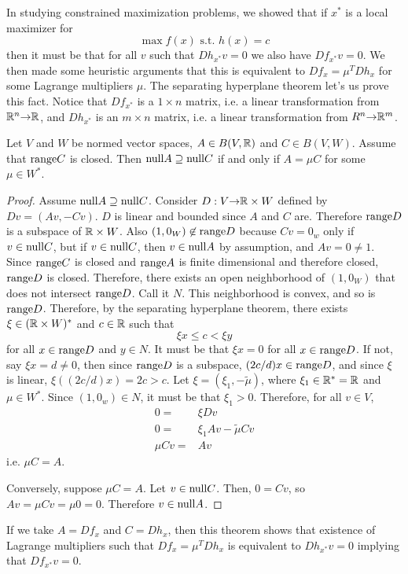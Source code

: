 In studying constrained maximization problems, we showed that if $x^*$
is a local maximizer for 
\[ \max f(x) \text{ s.t. } h(x) = c \]
then it must be that for all $v$ such that $Dh_{x^*} v = 0$ we also have
$Df_{x^*} v = 0$. We then made some heuristic arguments that this is
equivalent to $Df_x = \mu^T Dh_x$ for some Lagrange multipliers
$\mu$. The separating hyperplane theorem let's us prove this
fact. Notice that $Df_{x^*}$ is a $1 \times n$ matrix, i.e. a linear
transformation from $\mathbb{R}^n {\rightarrow} \mathbb{R}$, and $Dh_{x^*}$ is an $m \times n$
matrix, i.e. a linear transformation from $R^n {\rightarrow} \mathbb{R}^m$. 
\begin{theorem}\label{thm:multipliers}
  Let $V$ and $W$ be normed vector spaces, $A \in B(V,\mathbb{R})$ and
  $C \in B(V,W)$. Assume that $\mathrm{range} C$ is closed. Then
  $\mathrm{null} A \supseteq \mathrm{null} C$ if and only if $A = \mu C$ for some
  $\mu \in W^*$.
\end{theorem}
\begin{proof}
  Assume $\mathrm{null} A \supseteq \mathrm{null} C$. Consider $D:V {\rightarrow} \mathbb{R} \times W$
  defined by $Dv = (Av, -Cv)$. $D$ is linear and bounded since $A$ and
  $C$ are.  Therefore $\mathrm{range} D$ is a subspace of $\mathbb{R} \times W$. Also
  $(1,0_W) \not\in \mathrm{range} D$ because $Cv = 0_w$ only if
  $v \in \mathrm{null} C$, but if $v \in \mathrm{null} C$, then $v \in \mathrm{null} A$ by
  assumption, and $Av = 0 \neq 1$. Since $\mathrm{range} C$ is closed and
  $\mathrm{range} A$ is finite dimensional and therefore closed, $\mathrm{range} D$ is
  closed. Therefore, there exists an open neighborhood of $(1,0_W)$
  that does not intersect $\mathrm{range} D$. Call it $N$. This neighborhood
  is convex, and so is $\mathrm{range} D$. Therefore, by the separating
  hyperplane theorem, there exists $\xi \in (\mathbb{R} \times W)^*$ and
  $c \in \mathbb{R}$ such that
  \[ \xi x \leq c < \xi y \]
  for all $x \in \mathrm{range} D$ and $y \in N$.  It must be that $\xi x = 0$
  for all $x \in \mathrm{range} D$. If not, say $\xi x = d \neq 0$, then
  since $\mathrm{range} D$ is a subspace, $(2c/d) x \in \mathrm{range} D$, and since
  $\xi$ is linear, $\xi((2c/d) x) = 2c > c$.  Let
  $\xi = (\xi_1, -\tilde{\mu})$, where $\xi_1 \in \mathbb{R}^* = \mathbb{R}$ and
  $\mu \in W^*$. Since $(1,0_w) \in N$, it must be that $\xi_1 >
  0$. Therefore, for all $v \in V$,
  \begin{align*}
    0 = & \xi Dv \\
    0 = & \xi_1 Av - \tilde{\mu} Cv \\
    \mu C v = & Av 
  \end{align*}
  i.e. $\mu C = A$.

  Conversely, suppose $\mu C = A$. Let $v \in \mathrm{null} C$. Then, 
  $ 0 = C v $, so $A v = \mu C v = \mu 0 = 0$. Therefore $v \in \mathrm{null} A$.
\end{proof}
If we take $A = Df_x$ and $C = Dh_x$, then this theorem shows that
existence of Lagrange multipliers such that $Df_x = \mu^T Dh_x$ is
equivalent to $Dh_{x^*} v = 0$ implying that $Df_{x^*} v = 0$. 

